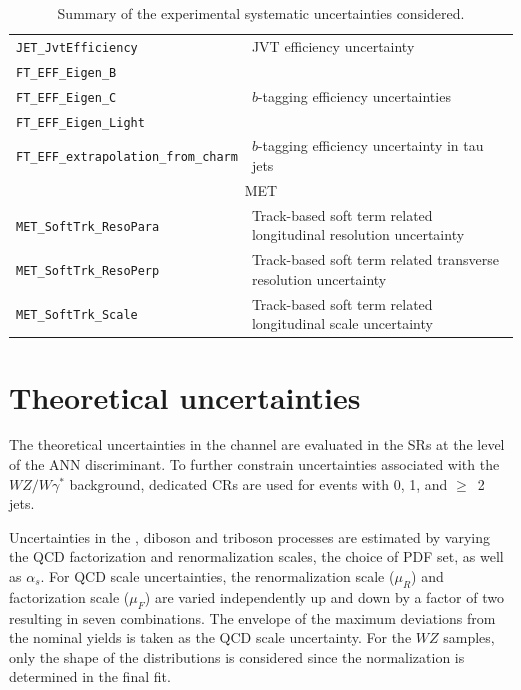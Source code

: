 \begin{table}
{\begin{tabular}{l|l}
  \texttt{JET\_JvtEfficiency}                           & JVT efficiency uncertainty \\
  \texttt{FT\_EFF\_Eigen\_B}                            & \multirow{3}{*}{$b$-tagging efficiency uncertainties} \\
  \texttt{FT\_EFF\_Eigen\_C}                            & \\
  \texttt{FT\_EFF\_Eigen\_Light}                            & \\
  \texttt{FT\_EFF\_extrapolation\_from\_charm}   & $b$-tagging efficiency uncertainty in tau jets \\
  \hline
  \multicolumn{2}{c}{MET} \\
  \hline
  \texttt{MET\_SoftTrk\_ResoPara} & Track-based soft term related longitudinal resolution uncertainty \\
  \texttt{MET\_SoftTrk\_ResoPerp} & Track-based soft term related transverse resolution uncertainty   \\
  \texttt{MET\_SoftTrk\_Scale}    & Track-based soft term related longitudinal scale uncertainty      \\
\hline\hline
\end{tabular}
}
\caption{Summary of the experimental systematic uncertainties considered.}\label{tab:expSyst}
\end{table}

\section{Theoretical uncertainties}\label{sec:TheorySystematics}

The theoretical uncertainties in the \wh{} channel are evaluated in the SRs at the level of the ANN discriminant. To further constrain uncertainties associated with the $WZ/W\gamma^{*}$ background, dedicated CRs are used for events with 0, 1, and $\geq$~2 jets.

Uncertainties in the \wh{}, diboson and triboson processes are estimated by varying the QCD factorization and renormalization scales, the choice of PDF set, as well as $\alpha_s$\@. For QCD scale uncertainties, the renormalization scale ($\mu_{R}$) and factorization scale ($\mu_{F}$) are varied independently up and down by a factor of two resulting in seven combinations. The envelope of the maximum deviations from the nominal yields is taken as the QCD scale uncertainty. For the $WZ$ samples, only the shape of the distributions is considered since the normalization is determined in the final fit.

